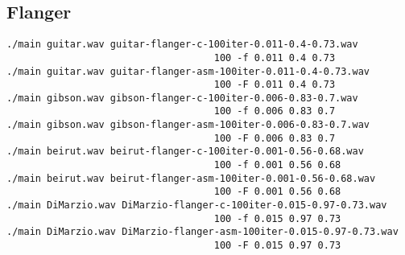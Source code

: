 \subsection{Flanger}
\label{subsec:resultados-flanger}

\begin{center}
\end{center}

\lstset{language=bash}
\begin{lstlisting}[frame=single]
./main guitar.wav guitar-flanger-c-100iter-0.011-0.4-0.73.wav 
                                    100 -f 0.011 0.4 0.73
./main guitar.wav guitar-flanger-asm-100iter-0.011-0.4-0.73.wav 
                                    100 -F 0.011 0.4 0.73
./main gibson.wav gibson-flanger-c-100iter-0.006-0.83-0.7.wav 
                                    100 -f 0.006 0.83 0.7
./main gibson.wav gibson-flanger-asm-100iter-0.006-0.83-0.7.wav 
                                    100 -F 0.006 0.83 0.7
./main beirut.wav beirut-flanger-c-100iter-0.001-0.56-0.68.wav 
                                    100 -f 0.001 0.56 0.68
./main beirut.wav beirut-flanger-asm-100iter-0.001-0.56-0.68.wav 
                                    100 -F 0.001 0.56 0.68
./main DiMarzio.wav DiMarzio-flanger-c-100iter-0.015-0.97-0.73.wav 
                                    100 -f 0.015 0.97 0.73
./main DiMarzio.wav DiMarzio-flanger-asm-100iter-0.015-0.97-0.73.wav 
                                    100 -F 0.015 0.97 0.73
\end{lstlisting} 
